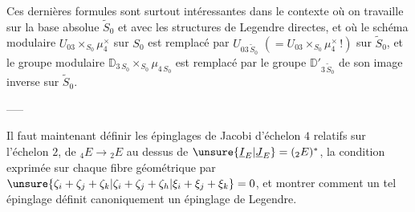 Ces dernières formules sont surtout intéressantes dans le contexte où on travaille  sur la base absolue $\widetilde S_0$ et avec les structures de Legendre directes, et où le schéma modulaire $U_{03}\times_{S_0}\mu_4^\times$ sur $S_0$ est remplacé par $U_{03\,\widetilde S_0}$ $(=U_{03}\times_{S_0}\mu_4^\times\,!)$ sur $\widetilde S_0$, et le groupe modulaire $\mathbb D_{3\,S_0}\times_{S_0}\mu_{4\,S_0}$ est remplacé par le groupe $\mathbb D'_{3\,\widetilde S_0}$ de  son image inverse sur $\widetilde S_0$.

\begin{center}--\quad --\quad --\end{center}

Il faut maintenant définir les épinglages de Jacobi d'échelon $4$ relatifs sur l'échelon $2$,   de $ {}_4E\longrightarrow {}_2E$ au dessus de $\unsure{\underline I_E|\underline J_E}=({}_2E)^*$,  la condition exprimée  sur chaque fibre géométrique par $\unsure{\zeta_i+\zeta_j+\zeta_k|\zeta_i+\zeta_j+\zeta_h|\xi_i+\xi_j+\xi_k}=0$, et montrer comment un tel épinglage définit canoniquement un épinglage de Legendre.
